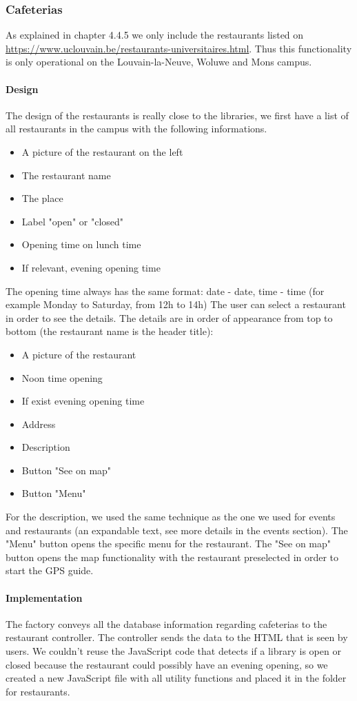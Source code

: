 \documentclass{eplmastersthesis}
\begin{document}
\subsubsection{Cafeterias}
As explained in chapter 4.4.5 we only include the restaurants listed on \url{https://www.uclouvain.be/restaurants-universitaires.html}. Thus this functionality is only operational on the Louvain-la-Neuve, Woluwe and Mons campus.
\paragraph{Design}
The design of the restaurants is really close to the libraries, we first have a list of all restaurants in the campus with the following informations.
\begin{itemize}
\item A picture of the restaurant on the left
\item The restaurant name
\item The place
\item Label "open" or "closed"
\item Opening time on lunch time
\item If relevant, evening opening time
\end{itemize}
The opening time always has the same format: date - date, time - time (for example Monday to Saturday, from 12h to 14h)
The user can select a restaurant in order to see the details. The details are in order of appearance from top to bottom (the restaurant name is the header title): 
\begin{itemize}
\item A picture of the restaurant
\item Noon time opening 
\item If exist evening opening time 
\item Address
\item Description
\item Button "See on map"
\item Button "Menu"
\end{itemize}
For the description, we used the same technique as the one we used for events and restaurants (an expandable text, see more details in the events section). The "Menu" button opens the specific menu for the restaurant. The "See on map" button opens the map functionality with the restaurant preselected in order to start the GPS guide.
\paragraph{Implementation}
The factory conveys all the database information regarding cafeterias to the restaurant controller. The controller sends the data to the HTML that is seen by users. We couldn't reuse the JavaScript code that detects if a library is open or closed because the restaurant could possibly have an evening opening, so we created a new JavaScript file with all utility functions and placed it in the folder for restaurants. 
\end{document}
